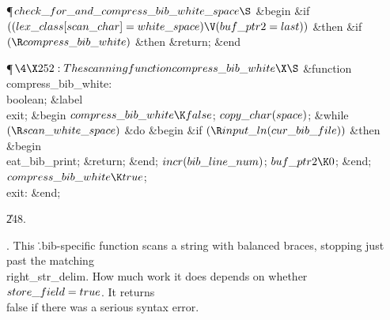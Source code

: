 \Y\P\D {}$\\{check\_for\_and\_compress\_bib\_white\_space}\S$\1\6
\&{begin} \&{if} $((\\{lex\_class}[\\{scan\_char}]=\\{white\_space})\V(%
\\{buf\_ptr2}=\\{last}))$ \1\&{then}\6
\&{if} $(\R\\{compress\_bib\_white})$ \1\&{then}\5
\&{return};\2\2\6
\&{end}\2\par
\Y\P$\4\X252:The scanning function \\{compress\_bib\_white}\X\S$\6
\4\&{function}\1\  \\{compress\_bib\_white}: \\{boolean};\6
\4\&{label} \\{exit};\2\6
\&{begin} $\\{compress\_bib\_white}\K\\{false}$;\6
$\\{copy\_char}(\\{space})$;\6
\&{while} $(\R\\{scan\_white\_space})$ \1\&{do}\6
\&{begin} \&{if} $(\R\\{input\_ln}(\\{cur\_bib\_file}))$ \1\&{then}%
\6
\&{begin} \\{eat\_bib\_print};\5
\&{return};\6
\&{end};\2\6
$\\{incr}(\\{bib\_line\_num})$;\5
$\\{buf\_ptr2}\K0$;\6
\&{end};\2\6
$\\{compress\_bib\_white}\K\\{true}$;\6
\4\\{exit}: \&{end};\par
\U248.\fi

.
This \.{.bib}-specific function scans a string with balanced braces,
stopping just past the matching \\{right\_str\_delim}.  How much work it
does depends on whether $\\{store\_field}=\\{true}$.  It returns \\{false} if
there was a serious syntax error.

